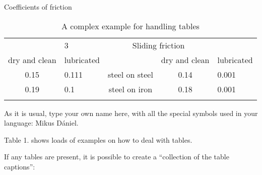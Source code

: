 \documentclass{article}
\begin{document}
\begin{table}[]
    \caption{A complex example for handling tables}
    \centering
    \renewcommand{\caption}[1]{#1}
   \caption{Coefficients of friction} \\
    \begin{tabular}{||c|l|c|c|l||}
     \hhline{|t:=====:t|}
        \multicolumn{2}{|c|}{Static friction} & 3 & \multicolumn{2}{|c|}{Sliding friction} \\
        \hhline{|:-----:|}
        dry and clean  & lubricated &  & dry and clean & lubricated  \\
        \hhline{|:=====:|}
        0.15 & 0.111 & steel on steel & 0.14 & 0.001  \\
        \hhline{||}
        0.19  & 0.1 & steel on iron & 0.18 & 0.001 \\
        \hhline{|b:=====:b|}
    \end{tabular}
    \label{tab:my_label}
\end{table}
\par
As it is usual, type your own name here, with all the special symbols used in your language: Mikus Dániel. \par
Table 1. shows loads of examples on how to deal with tables. \par
If any tables are present, it is possible to create a “collection of the table captions”:
\listoftables
\end{document}
